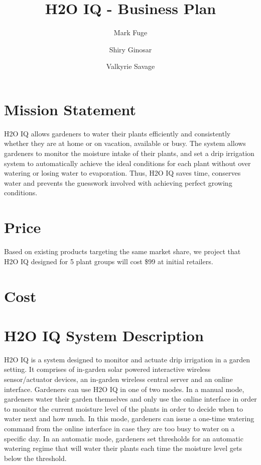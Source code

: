 \documentclass[11pt]{article}
\begin{document}
\title{H2O IQ - Business Plan}
\author{Mark Fuge \and Shiry Ginosar \and Valkyrie Savage}

\maketitle

\section{Mission Statement}

H2O IQ allows gardeners to water their plants efficiently and consistently whether they are at home or on vacation, available or busy. The system allows gardeners to monitor the moisture intake of their plants, and set a drip irrigation system to automatically achieve the ideal conditions for each plant without over watering or losing water to evaporation. Thus, H2O IQ saves time, conserves water and prevents the guesswork involved with achieving perfect growing conditions.

\section{Price}

Based on existing products targeting the same market share, we project that H2O IQ designed for 5 plant groups will cost \$99 at initial retailers. 

\section{Cost}

\section{H2O IQ System Description}

H2O IQ is a system designed to monitor and actuate drip irrigation in a garden setting. It comprises of in-garden solar powered interactive wireless sensor/actuator devices, an in-garden wireless central server and an online interface. Gardeners can use H2O IQ in one of two modes. In a manual mode, gardeners water their garden themselves and only use the online interface in order to monitor the current moisture level of the plants in order to decide when to water next and how much. In this mode, gardeners can issue a one-time watering command from the online interface in case they are too busy to water on a specific day. In an automatic mode, gardeners set thresholds for an automatic watering regime that will water their plants each time the moisture level gets below the threshold.
\end{document}

